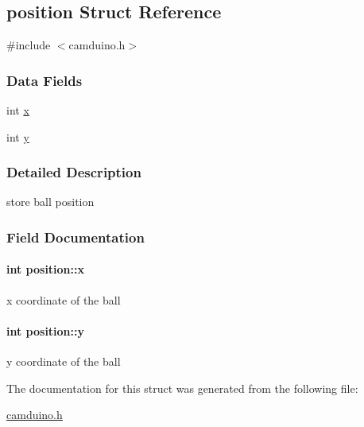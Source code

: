 \hypertarget{structposition}{\subsection{position Struct Reference}
\label{structposition}
}


{\ttfamily \#include $<$camduino.\+h$>$}

\subsubsection*{Data Fields}
\begin{DoxyCompactItemize}
\item 
int \hyperlink{structposition_aad0117268685890818989a6c0112ab8a}{x}
\item 
int \hyperlink{structposition_ab7163210f8aa5e8dc68ef434a315792c}{y}
\end{DoxyCompactItemize}


\subsubsection{Detailed Description}
store ball position 

\subsubsection{Field Documentation}
\hypertarget{structposition_aad0117268685890818989a6c0112ab8a}{
\paragraph[{x}]{\setlength{\rightskip}{0pt plus 5cm}int position\+::x}}\label{structposition_aad0117268685890818989a6c0112ab8a}
x coordinate of the ball \hypertarget{structposition_ab7163210f8aa5e8dc68ef434a315792c}{
\paragraph[{y}]{\setlength{\rightskip}{0pt plus 5cm}int position\+::y}}\label{structposition_ab7163210f8aa5e8dc68ef434a315792c}
y coordinate of the ball 

The documentation for this struct was generated from the following file\+:\begin{DoxyCompactItemize}
\item 
\hyperlink{camduino_8h}{camduino.\+h}\end{DoxyCompactItemize}

